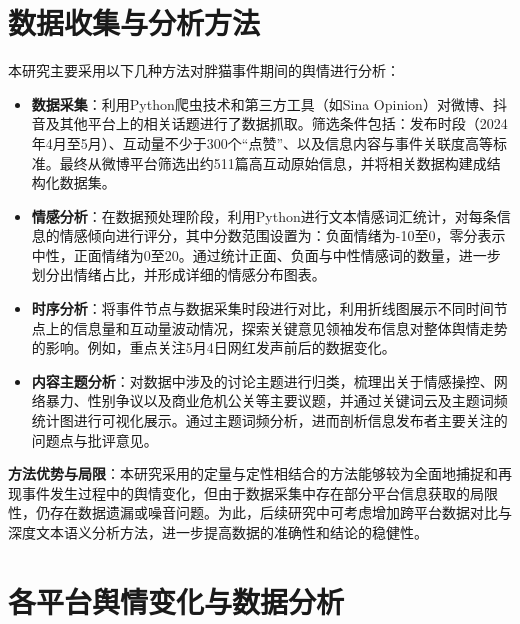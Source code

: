 \documentclass{article}
\begin{document}
\section{数据收集与分析方法}
本研究主要采用以下几种方法对胖猫事件期间的舆情进行分析：
\begin{itemize}
    \item \textbf{数据采集}：利用Python爬虫技术和第三方工具（如Sina Opinion）对微博、抖音及其他平台上的相关话题进行了数据抓取。筛选条件包括：发布时段（2024年4月至5月）、互动量不少于300个“点赞”、以及信息内容与事件关联度高等标准。最终从微博平台筛选出约511篇高互动原始信息，并将相关数据构建成结构化数据集。
    \item \textbf{情感分析}：在数据预处理阶段，利用Python进行文本情感词汇统计，对每条信息的情感倾向进行评分，其中分数范围设置为：负面情绪为-10至0，零分表示中性，正面情绪为0至20。通过统计正面、负面与中性情感词的数量，进一步划分出情绪占比，并形成详细的情感分布图表。
    \item \textbf{时序分析}：将事件节点与数据采集时段进行对比，利用折线图展示不同时间节点上的信息量和互动量波动情况，探索关键意见领袖发布信息对整体舆情走势的影响。例如，重点关注5月4日网红发声前后的数据变化。
    \item \textbf{内容主题分析}：对数据中涉及的讨论主题进行归类，梳理出关于情感操控、网络暴力、性别争议以及商业危机公关等主要议题，并通过关键词云及主题词频统计图进行可视化展示。通过主题词频分析，进而剖析信息发布者主要关注的问题点与批评意见。
\end{itemize}
\textbf{方法优势与局限}：本研究采用的定量与定性相结合的方法能够较为全面地捕捉和再现事件发生过程中的舆情变化，但由于数据采集中存在部分平台信息获取的局限性，仍存在数据遗漏或噪音问题。为此，后续研究中可考虑增加跨平台数据对比与深度文本语义分析方法，进一步提高数据的准确性和结论的稳健性。

\section{各平台舆情变化与数据分析}
\end{document}
